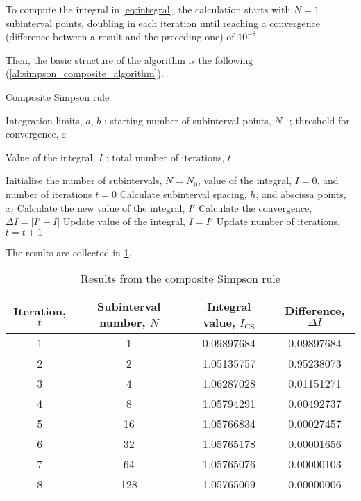 To compute the integral in \cref{eq:integral}, the calculation starts with
$N = 1$ subinterval points, doubling in each iteration until reaching a 
convergence (difference between a result and the preceding one) of $10^{-8}$.

Then, the basic structure of the algorithm is the following (\cref{al:simpson_composite_algorithm}).
\begin{algorithm}
    \caption{Composite Simpson rule}\label{al:simpson_composite_algorithm}
    \begin{algorithmic}[1]

        \Input Integration limits, $a$, $b$ ; starting number of subinterval
        points, $N_0$ ; threshold for convergence, $\varepsilon$ 

        \Output Value of the integral, $I$ ; total number of iterations, $t$

        \State Initialize the number of subintervals, $N = N_0$, value of
        the integral, $I = 0$, and number of iterations $t = 0$
            \State Calculate subinterval spacing, $h$, and abscissa points, $x_i$
            \State Calculate the new value of the integral, $I'$
            \State Calculate the convergence, $\Delta I = \left| I' - I \right|$
            \State Update value of the integral, $I = I'$
            \State Update number of iterations, $t = t + 1$
        \EndWhile

        \EndProcedure
    \end{algorithmic}
\end{algorithm}

The results are collected in \cref{tab:results_simpson}.

\begin{table}[tb!]
    \caption{Results from the composite Simpson rule}
    \label{tab:results_simpson}
    \centering
    \begin{tabular}{@{}c c c c@{}}
        \toprule
        Iteration, $t$ & Subinterval number, $N$ & Integral value, $I_{\text{CS}}$ & Difference, $\Delta I$ \\
        \midrule

         1 &           1 &     0.09897684 &     0.09897684 \\
         2 &           2 &     1.05135757 &     0.95238073 \\
         3 &           4 &     1.06287028 &     0.01151271 \\
         4 &           8 &     1.05794291 &     0.00492737 \\
         5 &          16 &     1.05766834 &     0.00027457 \\
         6 &          32 &     1.05765178 &     0.00001656 \\
         7 &          64 &     1.05765076 &     0.00000103 \\
         8 &         128 &     1.05765069 &     0.00000006 \\

        \bottomrule
    \end{tabular}
\end{table}

